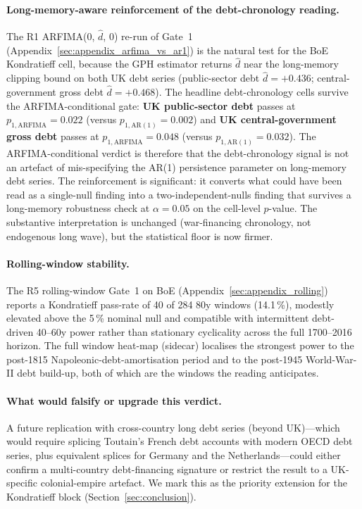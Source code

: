 \paragraph{Long-memory-aware reinforcement of the debt-chronology reading.}
The R1 ARFIMA(0, \(\hat d\), 0) re-run of Gate~1
(Appendix~\ref{sec:appendix_arfima_vs_ar1}) is the natural
test for the BoE Kondratieff cell, because the GPH estimator
returns \(\hat d\) near the long-memory clipping bound on
both UK debt series (public-sector debt
\(\hat d=+0.436\); central-government gross debt
\(\hat d=+0.468\)). The headline debt-chronology cells
survive the ARFIMA-conditional gate:
\textbf{UK public-sector debt} passes at
\(p_{1,\mathrm{ARFIMA}}=0.022\)
(versus \(p_{1,\mathrm{AR(1)}}=0.002\)) and
\textbf{UK central-government gross debt} passes at
\(p_{1,\mathrm{ARFIMA}}=0.048\)
(versus \(p_{1,\mathrm{AR(1)}}=0.032\)). The
ARFIMA-conditional verdict is therefore that the
debt-chronology signal is not an artefact of mis-specifying
the AR(1) persistence parameter on long-memory debt series.
The reinforcement is significant: it converts what could
have been read as a single-null finding into a
two-independent-nulls finding that survives a long-memory
robustness check at \(\alpha=0.05\) on the cell-level
\(p\)-value. The substantive interpretation is unchanged
(war-financing chronology, not endogenous long wave), but
the statistical floor is now firmer.

\paragraph{Rolling-window stability.}
The R5 rolling-window Gate~1 on BoE
(Appendix~\ref{sec:appendix_rolling}) reports a Kondratieff
pass-rate of 40 of 284 80y windows (14.1\,\%), modestly
elevated above the 5\,\% nominal null and compatible with
intermittent debt-driven 40--60y power rather than
stationary cyclicality across the full 1700--2016 horizon.
The full window heat-map (sidecar) localises the strongest
power to the post-1815 Napoleonic-debt-amortisation period
and to the post-1945 World-War-II debt build-up, both of
which are the windows the \citet{reinhart_rogoff2009}
reading anticipates.

\paragraph{What would falsify or upgrade this verdict.}
A future replication with cross-country long debt series
(beyond UK)---which would require splicing Toutain's French
debt accounts \citep{toutain1997} with modern OECD debt series,
plus equivalent splices for Germany and the Netherlands---could
either confirm a multi-country debt-financing signature or
restrict the result to a UK-specific colonial-empire artefact.
We mark this as the priority extension for the Kondratieff
block (Section~\ref{sec:conclusion}).

